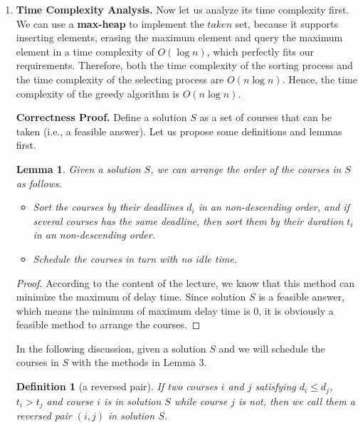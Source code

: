 \documentclass[12pt,a4paper]{article}
\makeatletter
\newtheorem{lemma}[theorem]{Lemma}
\newtheorem*{solution}{Solution}
\newtheorem*{ndefinition}{Definition}
\theoremstyle{definition}
\renewenvironment{solution}[1][Solution] {\par\pushQED{\qed}\normalfont\topsep6\p@\@plus6\p@\relax\trivlist\item[\hskip\labelsep\bfseries#1\@addpunct{.}]\ignorespaces}{\popQED\endtrivlist\@endpefalse} \makeatother
\makeatother
\begin{document}
\begin{enumerate}
\begin{solution}
        \textbf{\color{red}Time Complexity Analysis.} Now let us analyze its time complexity first. We can use a \textbf{max-heap} to implement the $taken$ set, because it supports inserting elements, erasing the maximum element and query the maximum element in a time complexity of $O(\log{n})$, which perfectly fits our requirements. Therefore, both the time complexity of the sorting process and the time complexity of the selecting process are $O(n\log{n})$. Hence, the time complexity of the greedy algorithm is $O(n\log{n})$.

        \textbf{\color{red}Correctness Proof.} Define a solution $S$ as a set of courses that can be taken (i.e., a feasible answer). Let us propose some definitions and lemmas first.
        \begin{lemma}\label{lemma3-0}
        Given a solution $S$, we can arrange the order of the courses in $S$ as follows.
        \begin{itemize}
        \item Sort the courses by their deadlines $d_i$ in an non-descending order, and if several courses has the same deadline, then sort them by their duration $t_i$ in an non-descending order.
        \item Schedule the courses in turn with no idle time.
        \end{itemize}
        \end{lemma}
        \begin{proof}
        According to the content of the lecture, we know that this method can minimize the maximum of delay time.
        Since solution $S$ is a feasible answer, which means the minimum of maximum delay time is 0, it is obviously a feasible method to arrange the courses.
        \end{proof}
        {\color{blue} In the following discussion, given a solution $S$ and we will schedule the courses in $S$ with the methods in Lemma 3.}
        \begin{ndefinition}[a reversed pair]
        If two courses $i$ and $j$ satisfying $d_i \leq d_j$, $t_i > t_j$ and course $i$ is in solution $S$ while course $j$ is not, then we call them a reversed pair $(i,j)$ in solution $S$.
        \end{ndefinition}


\end{solution}
\end{enumerate}
\end{document}
